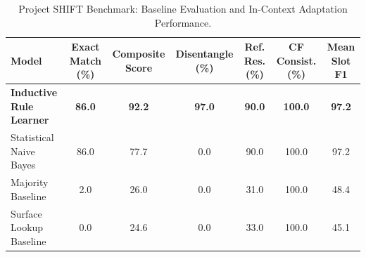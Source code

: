 \begin{table}[t]
\centering
\small
\caption{Project SHIFT Benchmark: Baseline Evaluation and In-Context Adaptation Performance.}
\label{tab:shift_results}
\begin{tabular}{lcccccc}
\toprule
\textbf{Model} & \textbf{Exact Match (\%)} & \textbf{Composite Score} & \textbf{Disentangle (\%)} & \textbf{Ref. Res. (\%)} & \textbf{CF Consist. (\%)} & \textbf{Mean Slot F1} \\
\midrule
\textbf{Inductive Rule Learner} & \textbf{86.0} & \textbf{92.2} & \textbf{97.0} & \textbf{90.0} & \textbf{100.0} & \textbf{97.2} \\
Statistical Naive Bayes & 86.0 & 77.7 & 0.0 & 90.0 & 100.0 & 97.2 \\
Majority Baseline & 2.0 & 26.0 & 0.0 & 31.0 & 100.0 & 48.4 \\
Surface Lookup Baseline & 0.0 & 24.6 & 0.0 & 33.0 & 100.0 & 45.1 \\
\bottomrule
\end{tabular}
\end{table}